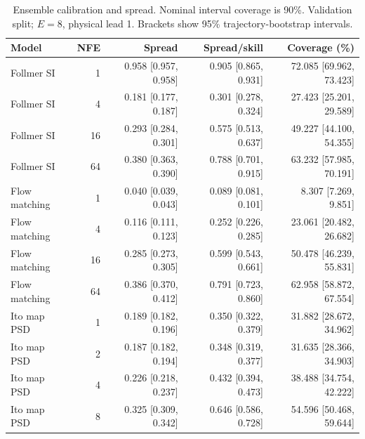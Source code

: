 \begin{table}[t]
\centering
\small
\setlength{\tabcolsep}{3pt}
\caption{Ensemble calibration and spread. Nominal interval coverage is 90\%. Validation split; $E=8$, physical lead 1. Brackets show 95\% trajectory-bootstrap intervals.}
\label{tab:map-calibration}
\begin{tabular}{lrrrr}
\toprule
Model & NFE & Spread & Spread/skill & Coverage (\%) \\
\midrule
Follmer SI & 1 & 0.958 [0.957, 0.958] & 0.905 [0.865, 0.931] & 72.085 [69.962, 73.423] \\
Follmer SI & 4 & 0.181 [0.177, 0.187] & 0.301 [0.278, 0.324] & 27.423 [25.201, 29.589] \\
Follmer SI & 16 & 0.293 [0.284, 0.301] & 0.575 [0.513, 0.637] & 49.227 [44.100, 54.355] \\
Follmer SI & 64 & 0.380 [0.363, 0.390] & 0.788 [0.701, 0.915] & 63.232 [57.985, 70.191] \\
\addlinespace
Flow matching & 1 & 0.040 [0.039, 0.043] & 0.089 [0.081, 0.101] & 8.307 [7.269, 9.851] \\
Flow matching & 4 & 0.116 [0.111, 0.123] & 0.252 [0.226, 0.285] & 23.061 [20.482, 26.682] \\
Flow matching & 16 & 0.285 [0.273, 0.305] & 0.599 [0.543, 0.661] & 50.478 [46.239, 55.831] \\
Flow matching & 64 & 0.386 [0.370, 0.412] & 0.791 [0.723, 0.860] & 62.958 [58.872, 67.554] \\
\addlinespace
Ito map PSD & 1 & 0.189 [0.182, 0.196] & 0.350 [0.322, 0.379] & 31.882 [28.672, 34.962] \\
Ito map PSD & 2 & 0.187 [0.182, 0.194] & 0.348 [0.319, 0.377] & 31.635 [28.366, 34.903] \\
Ito map PSD & 4 & 0.226 [0.218, 0.237] & 0.432 [0.394, 0.473] & 38.488 [34.754, 42.222] \\
Ito map PSD & 8 & 0.325 [0.309, 0.342] & 0.646 [0.586, 0.728] & 54.596 [50.468, 59.644] \\
\bottomrule
\end{tabular}
\end{table}
